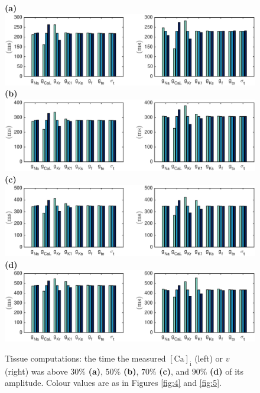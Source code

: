 \documentclass{article}
\begin{document}
\begin{figure}
 \textbf{(a)}  \includegraphics[trim=1cm 0cm 2cm 0cm, clip=true, width=1\linewidth]{30p} 
 \textbf{(b)}  \includegraphics[trim=1cm 0cm 2cm 0cm, clip=true, width=1\linewidth]{50p} 
 \textbf{(c)}   \includegraphics[trim=1cm 0cm 2cm 0cm, clip=true, width=1\linewidth]{70p} 
  \textbf{(d)}   \includegraphics[trim=1cm 0cm 2cm 0cm, clip=true, width=1\linewidth]{90p} 
    \caption{Tissue computations: the time the measured $[\mathrm{Ca}]_{\mathrm{i}}$ (left) or $v$ (right) was above $30\%$ \textbf{(a)}, $50\%$ \textbf{(b)}, $70\%$ \textbf{(c)}, and $90\%$ \textbf{(d)} of its amplitude. Colour values are as in Figures \ref{fig:4} and \ref{fig:5}.}
    \label{fig:7}
\end{figure}
\end{document}
